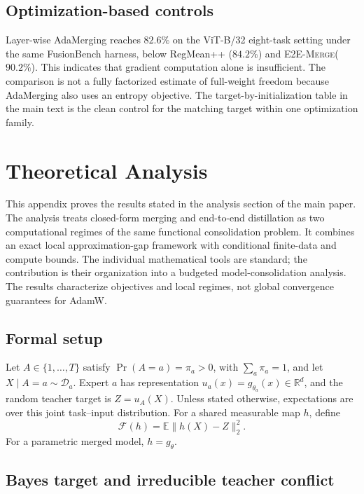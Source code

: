 \documentclass[letterpaper]{article} %
\newcommand{\method}{\textup{\textsc{E2E-Merge}}\xspace}
\theoremstyle{plain}
\theoremstyle{definition}
\begin{document}
\subsection{Optimization-based controls}
\label{app:optimization-controls}
Layer-wise AdaMerging reaches $82.6\%$ on the ViT-B/32 eight-task setting under the same FusionBench harness, below RegMean++ ($84.2\%$) and \method ($90.2\%$).
This indicates that gradient computation alone is insufficient.
The comparison is not a fully factorized estimate of full-weight freedom because AdaMerging also uses an entropy objective.
The target-by-initialization table in the main text is the clean control for the matching target within one optimization family.
\section{Theoretical Analysis}
\label{app:theory}

This appendix proves the results stated in the analysis section of the main paper.
The analysis treats closed-form merging and end-to-end distillation as two computational regimes of the same functional consolidation problem.
It combines an exact local approximation-gap framework with conditional finite-data and compute bounds.
The individual mathematical tools are standard; the contribution is their organization into a budgeted model-consolidation analysis.
The results characterize objectives and local regimes, not global convergence guarantees for AdamW.

\subsection{Formal setup}
Let $A\in\{1,\ldots,T\}$ satisfy $\Pr(A=a)=\pi_a>0$, with $\sum_a\pi_a=1$, and let $X\mid A=a\sim\mathcal D_a$.
Expert $a$ has representation $u_a(x)=g_{\theta_a}(x)\in\mathbb R^d$, and the random teacher target is $Z=u_A(X)$.
Unless stated otherwise, expectations are over this joint task--input distribution.
For a shared measurable map $h$, define
\begin{equation}
    \mathcal F(h)=\mathbb E\|h(X)-Z\|_2^2.
    \label{eq:appendix-F}
\end{equation}
For a parametric merged model, $h=g_\theta$.

\subsection{Bayes target and irreducible teacher conflict}
\label{app:bayes}
\end{document}
